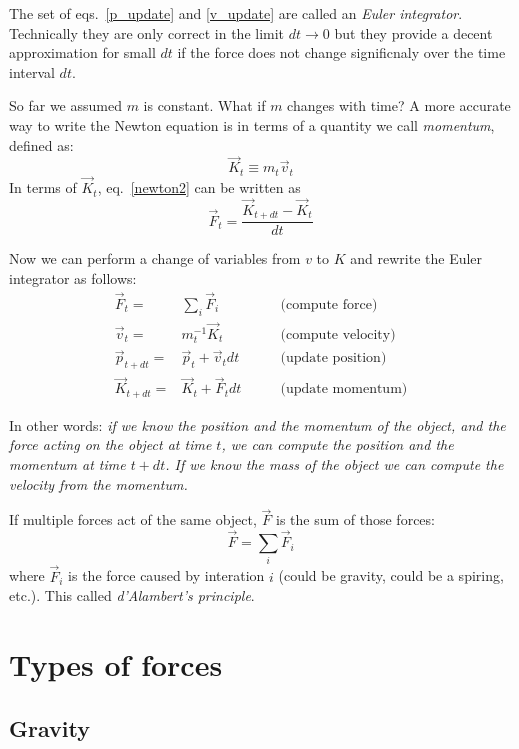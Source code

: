 \documentclass[12pt]{article}
\begin{document}
The set of eqs.~\ref{p_update} and \ref{v_update} are called an {\it Euler integrator}. Technically they are only correct in the limit $dt\rightarrow 0$ but they provide a decent approximation for small $dt$ if the force does not change significnaly over the time interval $dt$.

So far we assumed $m$ is constant. What if $m$ changes with time? A more accurate way to write the Newton equation is in terms of a quantity we call {\it momentum}, defined as:
\begin{equation}
\vec K_t \equiv m_t \vec v_t 
\end{equation}
In terms of $\vec K_t$, eq.~\ref{newton2} can be written as
\begin{equation}
\vec F_t = \frac{\vec K_{t+dt}-\vec K_t}{dt} 
\label{newton21}
\end{equation}

Now we can perform a change of variables from $v$ to $K$ and rewrite the Euler integrator as follows:
\begin{eqnarray}
\vec F_t =& \sum_i \vec F_i &\qquad \textrm{(compute force)}\\
\vec v_{t} =& m_t^{-1}\vec K_{t} &\qquad \textrm{(compute velocity)}\\
\vec p_{t+dt} =& \vec p_t + \vec v_t dt &\qquad \textrm{(update position)}\\
\vec K_{t+dt} =& \vec K_t + \vec F_t dt &\qquad \textrm{(update momentum)}\label{euler21}
\end{eqnarray}

In other words: {\it if we know the position and the momentum of the object, and the force acting on the object at time $t$, we can compute the position and the momentum at time $t+dt$. If we know the mass of the object we can compute the velocity from the momentum.}

If multiple forces act of the same object, $\vec F$ is the sum of those forces:
\begin{equation}
\vec F = \sum_i \vec F_i
\end{equation}
where $\vec F_i$ is the force caused by interation $i$ (could be gravity, could be a spiring, etc.). This called {\it d'Alambert's principle}.

\section{Types of forces}

\subsection{Gravity}
\end{document}
